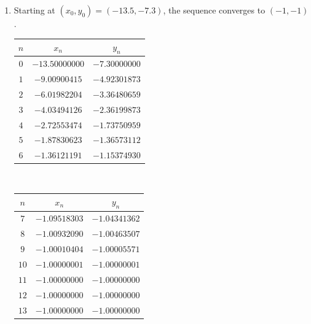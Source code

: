 \begin{example}
\begin{enumerate}
	\item Starting at $(x_0, y_0) = (-13.5, -7.3)$, the sequence converges to $(-1,-1)$.  %
	\begin{center}
	\begin{tabular}{|c|c|c|} \hline 
	$n$ & $x_n$ & $y_n$ \\ \hline \hline 
	$0$ & $-13.50000000$ & $-7.30000000$ \\ \hline 
	$1$ & $-9.00900415$ & $-4.92301873$ \\ \hline 
	$2$ & $-6.01982204$ & $-3.36480659$ \\ \hline 
	$3$ & $-4.03494126$ & $-2.36199873$ \\ \hline 
	$4$ & $-2.72553474$ & $-1.73750959$ \\ \hline 
	$5$ & $-1.87830623$ & $-1.36573112$ \\ \hline 
	$6$ & $-1.36121191$ & $-1.15374930$ \\ \hline 
	\end{tabular}~\begin{tabular}{|c|c|c|} \hline
	$n$ & $x_n$ & $y_n$ \\ \hline \hline 
	$7$ & $-1.09518303$ & $-1.04341362$ \\ \hline 
	$8$ & $-1.00932090$ & $-1.00463507$ \\ \hline 
	$9$ & $-1.00010404$ & $-1.00005571$ \\ \hline 
	$10$ & $-1.00000001$ & $-1.00000001$ \\ \hline 
	$11$ & $-1.00000000$ & $-1.00000000$ \\ \hline 
	$12$ & $-1.00000000$ & $-1.00000000$ \\ \hline 
	$13$ & $-1.00000000$ & $-1.00000000$ \\ \hline 
	\end{tabular}
	\end{center}
\end{enumerate}
\end{example}


